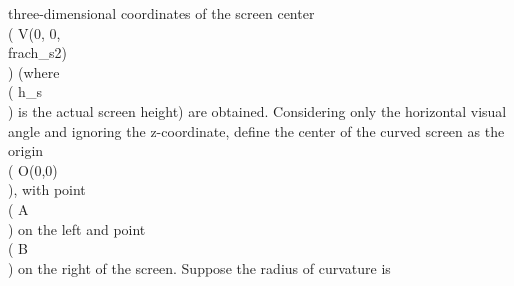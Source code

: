  three-dimensional coordinates of the screen center \\( V(0, 0, \\frac{h_s}{2}) \\) (where \\( h_s \\) is the actual screen height) are obtained. Considering only the horizontal visual angle and ignoring the z-coordinate, define the center of the curved screen as the origin \\( O(0,0) \\), with point \\( A \\) on the left and point \\( B \\) on the right of the screen. Suppose the radius of curvature is \